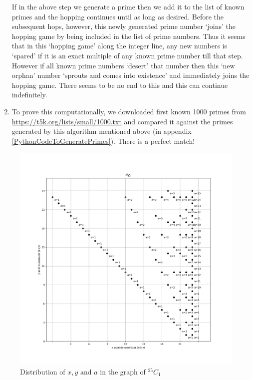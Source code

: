 \documentclass[12pt, twoside]{article}
\newcommand*{\Combination}[2]{{}^{#1}C_{#2}}%
\begin{document}
\begin{enumerate}
	\subitem If in the above step we generate a prime then we add it to the list of known primes and the hopping continues until as long as desired. Before the subsequent hops, however, this newly generated prime number `joins' the hopping game by being included in the list of prime numbers.
	\subitem Thus it seems that in this `hopping game' along the integer line, any new numbers is `spared' if it is an exact multiple of any known prime number till that step. However if all known prime numbers `desert' that number then this `new orphan' number `sprouts and comes into existence' and immediately joins the hopping game. There seems to be no end to this and this can continue indefinitely.
	\item To prove this computationally, we downloaded first known 1000 primes from \url{https://t5k.org/lists/small/1000.txt}  and compared it against the primes generated by this algorithm mentioned above (in appendix \ref{PythonCodeToGeneratePrimes}). There is a perfect match!
	
\end{enumerate}
\begin{figure}[ph!]
\includegraphics[width=\linewidth]{25_1_alone.png}
\caption{Distribution of $x,y \text{ and } a$ in the graph of $\Combination{25}{1}$}
\label{25_C_1_example}
\end{figure}
\end{document}
